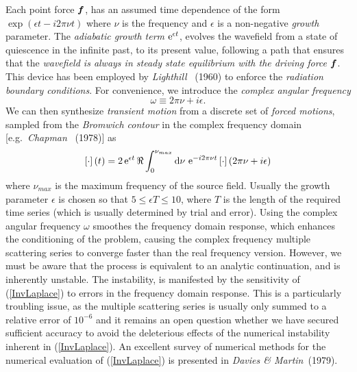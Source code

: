 \documentclass[11pt,a4paper]{article}
\newcommand{\bmi}[1]{\mbox{\boldmath$\mit #1$\unboldmath}}
\begin{document}
Each point force  ${\bmi f}$,  has an assumed time
dependence of the form
$\exp(\epsilon t -i 2 \pi \nu t)$ where
$\nu $ is the  frequency and $\epsilon$ is a non-negative {\em
growth\/} parameter. The {\em adiabatic growth term\/} ${\rm e}^{\epsilon
t}$,
evolves the wavefield from a state of quiescence in the infinite past, to
its
present value, following a path that ensures that the {\em wavefield is
always in steady
state equilibrium with the driving force\/} ${\bmi f}$. This device has been
employed by
{\em Lighthill} ~(1960) to enforce the {\em radiation
boundary conditions\/}.
For  convenience, we introduce the {\em complex angular frequency\/}
\begin{equation} \label{w+}
\omega\equiv 2 \pi \nu +i \epsilon.
\end{equation}
We can then synthesize {\em transient motion\/} from a discrete set of
{\em
forced motions\/}, sampled from the {\em Bromwich contour\/} in the
complex frequency
domain [e.g.\ {\em Chapman} ~(1978)] as
\begin{equation}	\label{InvLaplace}
	\left[{\cdot }\right](t)=2 \, {\rm e}^{\epsilon  t}\,
	\Re \int_{ 0}^{\nu_{max}} {\rm d}\nu \ {\rm e}^{ -i
	2 \pi \nu t}\left[{\cdot }\right] (2 \pi \nu +i \epsilon)
\end{equation}
where $\nu_{{max}}$ is the maximum frequency of the source field.
Usually the growth parameter $\epsilon$ is chosen so that $5 \le \epsilon T
\le 10$, where $T$ is the length of the required time series (which is
usually determined by trial and error). Using the complex angular frequency $\omega$ smoothes the frequency domain
response, which enhances the conditioning of the problem,
causing the complex frequency multiple scattering series to converge
faster than the real frequency version. However, we must be aware that the
process is equivalent to an analytic continuation, and is inherently
unstable. The instability, is manifested by the sensitivity of
(\ref{InvLaplace}) to errors in the frequency domain response. This is a
particularly troubling issue, as the multiple scattering series is
usually only summed to a relative error of $10^{-6}$ and it remains an
open question whether we have secured sufficient accuracy to avoid the
deleterious effects of the numerical instability inherent in
(\ref{InvLaplace}). An excellent survey of numerical methods for the
numerical evaluation of (\ref{InvLaplace}) is presented in
{\em Davies \& Martin\/}~(1979).
\end{document}
